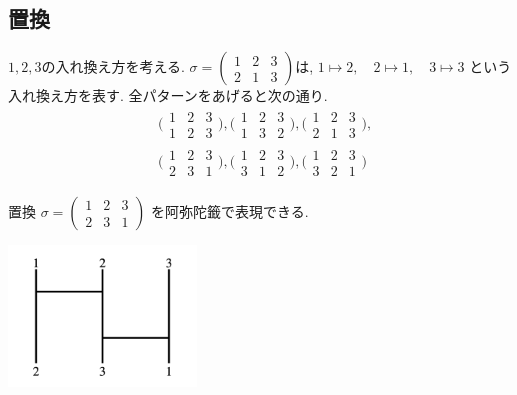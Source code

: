 \documentclass[11pt, a4paper, dvipdfmx]{jsarticle}
\theoremstyle{definition}
\theoremstyle{mystyle}
\numberwithin{equation}{section} %
\begin{document}
\subsection{置換}

$1,2,3$の入れ換え方を考える. 
$\sigma = \begin{pmatrix}
    1 & 2 & 3\\
    2 & 1 & 3
\end{pmatrix}$は, 
$1\mapsto 2,\quad 2\mapsto 1,\quad 3\mapsto 3$
という入れ換え方を表す. 
全パターンをあげると次の通り. 
\begin{align*}
    &\Big(\begin{array}{ccc}
        1 & 2 & 3 \\
        1 & 2 & 3 
    \end{array}\Big), 
    \Big(\begin{array}{ccc}
        1 & 2 & 3\\
        1 & 3 & 2
    \end{array}\Big), 
    \Big(\begin{array}{ccc}
        1 & 2 & 3\\
        2 & 1 & 3
    \end{array}\Big), \\
    &\Big(\begin{array}{ccc}
        1 & 2 & 3\\
        2 & 3 & 1
    \end{array}\Big), 
    \Big(\begin{array}{ccc}
        1 & 2 & 3\\
        3 & 1 & 2
    \end{array}\Big), 
    \Big(\begin{array}{ccc}
        1 & 2 & 3\\
        3 & 2 & 1
    \end{array}\Big)
\end{align*}

置換 $\sigma = \begin{pmatrix}
    1 & 2 & 3\\
    2 & 3 & 1
\end{pmatrix}$ を阿弥陀籤で表現できる. 
\begin{center}
    \includegraphics[width=5cm]{permutation/permutation1.png}
\end{center}
\end{document}

